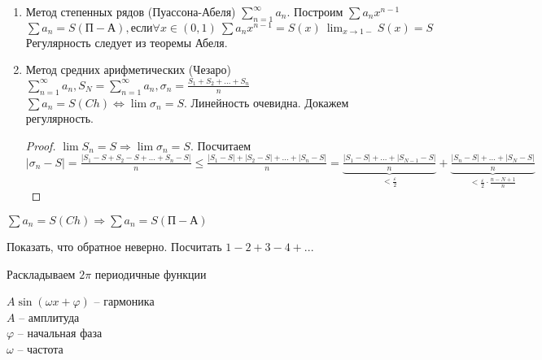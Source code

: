 \begin{Example}
    \begin{enumerate}
        \item Метод степенных рядов (Пуассона-Абеля)
        $\sum_{n=1}^{\infty} a_n$. Построим $\sum a_n x^{n-1}$\\
        $\sum a_n = S (П-А), если \forall x \in (0,1) \ \sum a_n x^{n-1} = S(x) \ \lim_{x \to 1-} S(x) = S$\\
        Регулярность следует из теоремы Абеля. 
        \item Метод средних арифметических (Чезаро)\\
        $\sum_{n=1}^{\infty} a_n, S_N = \sum_{n=1}^{\infty} a_n, \sigma_n = \frac{S_1 + S_2 + ... + S_n}{n}$\\
        $\sum a_n = S (Ch) \Leftrightarrow \lim \sigma_n = S$. 
        Линейность очевидна. Докажем регулярность. 

        \begin{proof}
            $\lim S_n = S \Rightarrow \lim \sigma_n = S$. Посчитаем $|\sigma_n - S| = \frac{|S_1 - S + S_2 - S + ... + S_n - S|}{n} \leqslant 
            \frac{|S_1 - S| + |S_2 - S| + ... + |S_n - S|}{n}  = \underbrace{\frac{|S_1 - S|+...+|S_{N-1} - S|}{n}}_{< \frac{\varepsilon}{2}} + 
            \underbrace{\frac{|S_n - S| + ... + |S_N - S|}{n}}_{< \frac{\varepsilon}{2} \cdot \frac{n - N + 1}{n} } $
        \end{proof}
    \end{enumerate}
\end{Example}

\begin{Thm}[Фробениуса] 
    $\sum a_n = S(Ch) \Rightarrow \sum a_n = S(П-А)$
\end{Thm} 

\begin{Example}
    Показать, что обратное неверно. Посчитать $1 - 2 + 3 - 4 + ...$
\end{Example}


\begin{Rem}
    Раскладываем $2 \pi$ периодичные функции
\end{Rem}

\begin{Def}
    $A \sin (\omega x + \varphi)$ -- гармоника\\
    $A $ -- амплитуда\\
    $\varphi $ -- начальная фаза\\
    $\omega$ -- частота\\
\end{Def}

